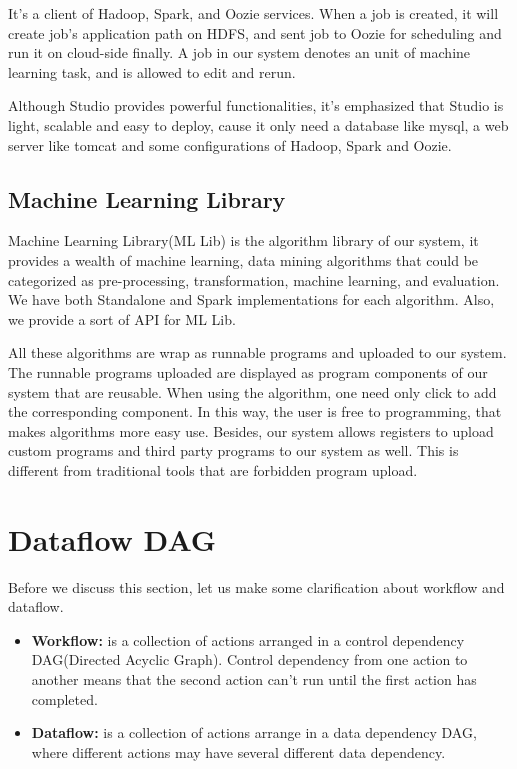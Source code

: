 \documentclass{sig-alternate-05-2015}
\begin{document}
It's a client of Hadoop, Spark, and Oozie services. When a job is created, it will create job's application path on HDFS, and sent job to Oozie for scheduling and run it on cloud-side finally. A job in our system denotes an unit of machine learning task, and is allowed to edit and rerun.

Although Studio provides powerful functionalities, it's emphasized that Studio is light, scalable and easy to deploy, cause it only need a database like mysql, a web server like tomcat and some configurations of Hadoop, Spark and Oozie.


\subsection{Machine Learning Library}
Machine Learning Library(ML Lib) is the algorithm library of our system, it provides a wealth of machine learning, data mining algorithms that could be categorized as pre-processing, transformation, machine learning, and evaluation. We have both Standalone and Spark implementations for each algorithm. Also, we provide a sort of API for ML Lib. 

All these algorithms are wrap as runnable programs and uploaded to our system. The runnable programs uploaded are displayed as program components of our system that are reusable. When using the algorithm, one need only click to add the corresponding component. In this way, the user is free to programming, that makes algorithms more easy use. Besides, our system allows registers to upload custom programs and third party programs to our system as well. This is different from traditional tools that are forbidden program upload.


\section{Dataflow DAG}
Before we discuss this section, let us make some clarification about workflow and dataflow.

\begin{itemize}
\item \textbf{Workflow:} is a collection of actions arranged in a control dependency DAG(Directed Acyclic Graph). Control dependency from one action to another means that the second action can't run until the first action has completed.
\item \textbf{Dataflow:} is a collection of actions arrange in a data dependency DAG, where different actions may have several different data dependency.
\end{itemize}
\end{document}
